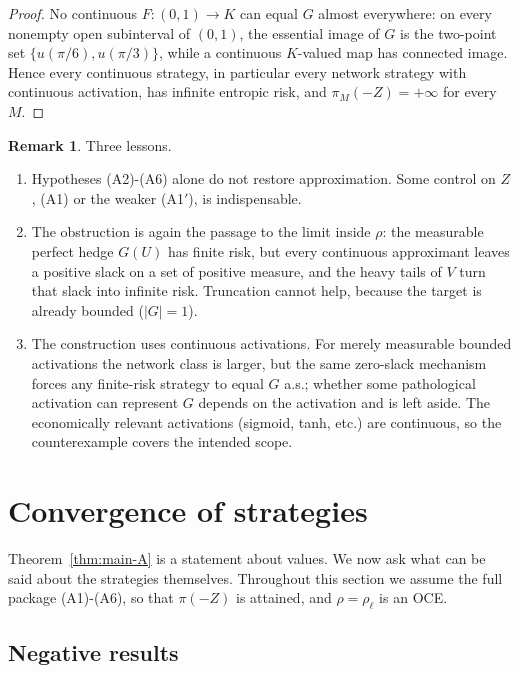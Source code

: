 \documentclass[11pt,a4paper]{report}
\numberwithin{equation}{chapter}
\theoremstyle{plain}
\theoremstyle{definition}
\newtheorem{remark}[proposition]{Remark}
\begin{document}
\begin{proof}
    No continuous $F\colon(0,1)\to K$ can equal $G$ almost everywhere: on every nonempty open subinterval of $(0,1)$, the essential image of $G$ is the two-point set $\{u(\pi/6),u(\pi/3)\}$, while a continuous $K$-valued map has connected image. Hence every continuous strategy, in particular every network strategy with continuous activation, has infinite entropic risk, and $\pi_M(-Z)=+\infty$ for every $M$.
\end{proof}

\begin{remark}\label{rem:sharp-lessons}
    Three lessons.
    \begin{enumerate}[leftmargin=*,itemsep=0pt,parsep=0pt]
        \item[\textup{(i)}] Hypotheses (A2)-(A6) alone do not restore approximation. Some control on $Z$, (A1) or the weaker (A1$'$), is indispensable.
        \item[\textup{(ii)}] The obstruction is again the passage to the limit inside $\rho$: the measurable perfect hedge $G(U)$ has finite risk, but every continuous approximant leaves a positive slack on a set of positive measure, and the heavy tails of $V$ turn that slack into infinite risk. Truncation cannot help, because the target is already bounded ($|G|=1$).
        \item[\textup{(iii)}] The construction uses continuous activations. For merely measurable bounded activations the network class is larger, but the same zero-slack mechanism forces any finite-risk strategy to equal $G$ a.s.; whether some pathological activation can represent $G$ depends on the activation and is left aside. The economically relevant activations (sigmoid, tanh, etc.) are continuous, so the counterexample covers the intended scope.
    \end{enumerate}
\end{remark}

\section{Convergence of strategies}\label{sec:strategy-A}

Theorem~\ref{thm:main-A} is a statement about values. We now ask what can be said about the strategies themselves. Throughout this section we assume the full package (A1)-(A6), so that $\pi(-Z)$ is attained, and $\rho=\rho_\ell$ is an OCE.

\subsection*{Negative results}
\end{document}
